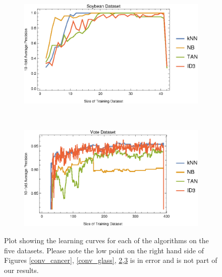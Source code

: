 \documentclass{article}
\begin{document}
\begin{figure}[h!]
\begin{subfigure}[b]{0.49\textwidth}
				\caption{}		
				\label{conv_iris}			
			\end{subfigure} \	
			\begin{subfigure}[b]{0.49\textwidth}
				\centering
				\includegraphics[width=\textwidth]{figs//plot_conv_soybean}		
				\caption{}
				\label{conv_soybean}				
			\end{subfigure} \	
			\begin{subfigure}[b]{0.49\textwidth}
				\centering
				\includegraphics[width=\textwidth]{figs/plot_conv_vote}			
				\caption{}	
				\label{conv_vote}		
			\end{subfigure}
			\caption{Plot showing the learning curves for each of the algorithms on the five datasets. Please note the low point on the right hand side of Figures \ref{conv_cancer}, \ref{conv_glass},  \ref{conv_soybean},\ref{conv_vote} is in error and is not part of our results.}
			\label{conv_plot}
		\end{figure}
		
\end{document}
